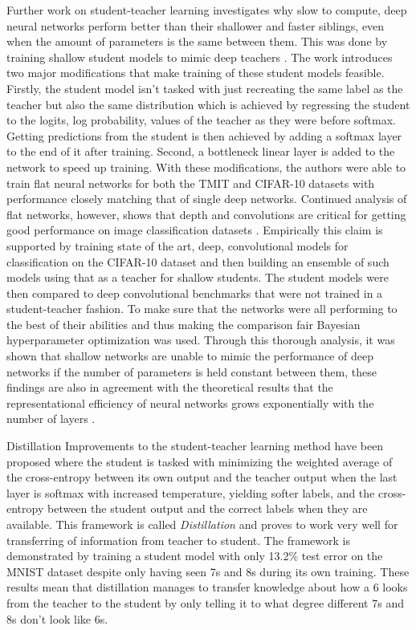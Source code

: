 \documentclass{kththesis}
\newcommand{\bibentry}[1]{\parencite{#1}}
\newcommand{\subsubsubsection}{}
\begin{document}
Further work on student-teacher learning investigates why slow to compute, deep
neural networks perform better than their shallower and faster siblings, even when
the amount of parameters is the same between them.
This was done by training shallow student models to mimic
deep teachers \bibentry{ba2014deep}. The work introduces two major modifications
that make training of these student models feasible. Firstly, the student model
isn't tasked with just recreating the same label as the teacher but also the
same distribution which is achieved by regressing the student to the logits, log
probability, values of the teacher as they were before softmax. Getting
predictions from the student is then achieved by adding a softmax layer to the
end of it after training. Second, a bottleneck linear layer is added to the
network to speed up training. With these modifications, the authors were able to train
flat neural networks for both the TMIT and CIFAR-10 datasets with performance
closely matching that of single deep networks. Continued analysis of flat
networks, however, shows that depth and convolutions are critical for getting good
performance on image classification datasets \bibentry{urban2016deep}.
Empirically this claim is supported by training state of the art, deep,
convolutional models for classification on the CIFAR-10 dataset and then
building an ensemble of such models using that as a teacher for shallow
students. The student models were then compared to deep convolutional benchmarks
that were not trained in a student-teacher fashion. To make sure that the
networks were all performing to the best of their abilities and thus making the
comparison fair Bayesian hyperparameter optimization
\bibentry{snoek2012practical} was used. Through this thorough analysis, it was
shown that shallow networks are unable to mimic the performance of deep networks
if the number of parameters is held constant between them, these findings are
also in agreement with the theoretical results that the representational
efficiency of neural networks grows exponentially with the number of layers
\bibentry{liang2016deep}. 

\subsubsubsection{Distillation}
Improvements to the student-teacher learning method have been proposed where the
student is tasked with minimizing the weighted average of the cross-entropy
between its own output and the teacher output when the last layer is softmax
with increased temperature, yielding softer labels, and the cross-entropy
between the student output and the correct labels when they are available. This
framework is called \emph{Distillation} \bibentry{hinton2015distilling} and
proves to work very well for transferring of information from teacher to
student. The framework is demonstrated by training a student model with only
13.2\% test error on the MNIST dataset despite only having seen 7s and 8s during
its own training. These results mean that distillation manages to transfer
knowledge about how a 6 looks from the teacher to the student by only telling it
to what degree different 7s and 8s don't look like 6s. 
\end{document}

